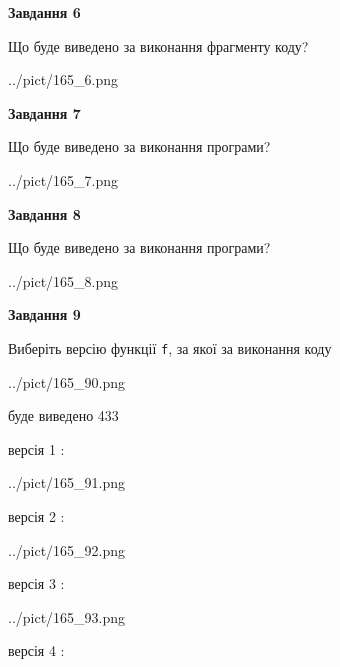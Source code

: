 \documentclass[12pt, ukrainian]{article}
\def\code#1{\Verb!#1!}
\begin{document}
{\begin {large}
{\begin {center}\textbf{Завдання 6}\end {center}}

Що буде виведено за виконання фрагменту коду?\par
\begin{center}
	{../pict/165_6.png}
\end{center}
\newpage

{\begin {center}\textbf{Завдання 7}\end {center}}

Що буде виведено за виконання програми?\par
\begin{center}
	{../pict/165_7.png}
\end{center}
\newpage

{\begin {center}\textbf{Завдання 8}\end {center}}

Що буде виведено за виконання програми?\par
\begin{center}
	{../pict/165_8.png}
\end{center}
\newpage

{\begin {center}\textbf{Завдання 9}\end {center}}

Виберіть версію функції \code{f}, за якої за виконання коду
\begin{center}
	{../pict/165_90.png}
\end{center}
буде виведено 433

\vspace{5mm}
версія 1 :

\begin{center}
	{../pict/165_91.png}
\end{center}
версія 2 :

\begin{center}
	{../pict/165_92.png}
\end{center}
версія 3 :

\begin{center}
	{../pict/165_93.png}
\end{center}
версія 4 :


\end{large}}
\end{document}
